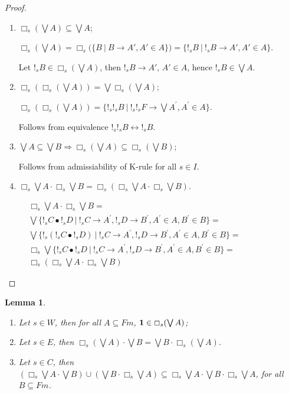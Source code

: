 \documentclass[a4paper]{article}
\newtheorem{lemma}{Lemma}
\begin{document}
\begin{proof}
$ $

\begin{enumerate}
  \item $\Box_s (\bigvee A) \subseteq \bigvee A$;

$\Box_s (\bigvee A) = \Box_s (\{ B \: | \: B \rightarrow A', A' \in A\}) =
\{ !_s B \: | \: !_s B \rightarrow A', A' \in A\}$.

Let $!_s B \in \Box_s (\bigvee A)$, then $!_s B \rightarrow A'$, $A' \in A$, hence $!_s B \in \bigvee A$.

\item $\Box_s (\Box_s(\bigvee A)) = \bigvee \Box_s (\bigvee A)$;

$\Box_s (\Box_s(\bigvee A)) = \{ !_s !_s B \: | \: !_s !_s F \rightarrow \bigvee A^{'}, A^{'} \in A \}$.

Follows from equivalence $!_s !_s B \leftrightarrow !_s B$.

\item $\bigvee A \subseteq \bigvee B \Rightarrow \Box_s (\bigvee A) \subseteq \Box_s (\bigvee B)$;

Follows from admissiability of K-rule for all $s \in I$.

\item $\Box_s \bigvee A \cdot \Box_s \bigvee B = \Box_s (\Box_s \bigvee A \cdot \Box_s \bigvee B)$.

$\begin{array}{lll}
&\Box_s \bigvee A \cdot \Box_s \bigvee B = & \\
&\bigvee \{ !_s C \bullet !_s D \: | \: !_s C \rightarrow A^{'}, !_s D \rightarrow B^{'}, A^{'} \in A, B^{'} \in B \} = & \\
&\bigvee \{ !_s (!_s C \bullet !_s D) \: | \: !_s C \rightarrow A^{'}, !_s D \rightarrow B^{'}, A^{'} \in A, B^{'} \in B \} = & \\
&\Box_s \bigvee \{ !_s C \bullet !_s D \: | \: !_s C \rightarrow A^{'}, !_s D \rightarrow B^{'}, A^{'} \in A, B^{'} \in B \} = & \\
&\Box_s (\Box_s \bigvee A \cdot \Box_s \bigvee B)&
\end{array}$

\end{enumerate}
\end{proof}

\begin{lemma}
  \begin{enumerate}
    \item Let $s \in W$, then for all $A \subseteq Fm$, ${\bf 1} \in \Box_s (\bigvee A)$;
    \item Let $s \in E$, then $\Box_s (\bigvee A) \cdot \bigvee B = \bigvee B \cdot \Box_s (\bigvee A)$.
    \item Let $s \in C$, then $(\Box_s \bigvee A \cdot \bigvee B) \cup (\bigvee B \cdot \Box_s \bigvee A) \subseteq \Box_s \bigvee A \cdot \bigvee B \cdot \Box_s \bigvee A$, for all $B \subseteq Fm$.
  \end{enumerate}
\end{lemma}
\end{document}
